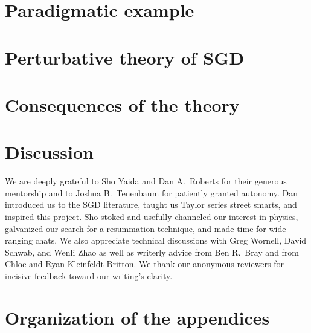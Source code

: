     \section{Paradigmatic example}\label{sect:entropic-example}
        
      
    \section{Perturbative theory of SGD}\label{sect:calculus}
        

    \section{Consequences of the theory}\label{sect:consequences}
        
       
    \section{Discussion}
        

        We are deeply grateful to Sho Yaida and Dan A.\ Roberts for their
        generous mentorship and to Joshua B.\ Tenenbaum for patiently
        granted autonomy.  Dan introduced us to the SGD literature, taught us
        Taylor series street smarts, and inspired this project.  Sho stoked and
        usefully channeled our interest in physics, galvanized our search for a
        resummation technique, and made time for wide-ranging chats.  We also
        appreciate technical discussions with Greg Wornell, David Schwab, and
        Wenli Zhao as well as writerly advice from Ben R.\ Bray and
        from Chloe and Ryan
        Kleinfeldt-Britton.
        We thank our anonymous reviewers for incisive feedback toward our
        writing's clarity.
    
    
    
    \appendix

    \newpage
    \section*{Organization of the appendices}
        

    \newpage
